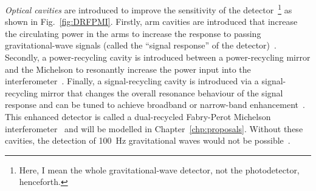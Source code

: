 \emph{Optical cavities} are introduced to improve the sensitivity of the detector~\footnote{Here, I mean the whole gravitational-wave detector, not the photodetector, henceforth.} as shown in Fig.~\ref{fig:DRFPMI}. %
Firstly, arm cavities are introduced that increase the circulating power in the arms to increase the response to passing gravitational-wave signals (called the ``signal response'' of the detector)~\cite{bond_2010}.
Secondly, a power-recycling cavity is introduced between a power-recycling mirror and the Michelson to resonantly increase the power input into the interferometer~\cite{meersRecyclingLaserinterferometricGravitationalwave1988,bond_2010}.
Finally, a signal-recycling cavity is introduced via a signal-recycling mirror that changes the overall resonance behaviour of the signal response and can be tuned to achieve broadband or narrow-band enhancement~\cite{meersRecyclingLaserinterferometricGravitationalwave1988,1995AuJPh..48..953M}.
This enhanced detector is called a dual-recycled Fabry-Perot Michelson interferometer~\cite{meersRecyclingLaserinterferometricGravitationalwave1988,bond_2010} and will be modelled in Chapter~\ref{chp:proposals}. Without these cavities, the detection of 100~Hz gravitational waves would not be possible~\cite{AdvancedLIGO:2015}. %

